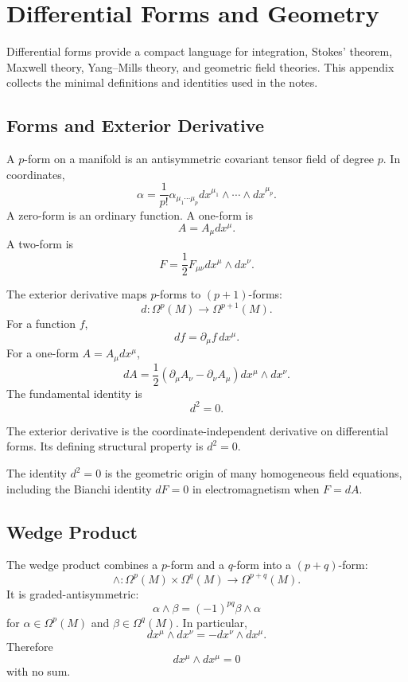 \chapter{Differential Forms and Geometry}

\begin{remarkbox}
Differential forms provide a compact language for integration, Stokes' theorem,
Maxwell theory, Yang--Mills theory, and geometric field theories. This appendix
collects the minimal definitions and identities used in the notes.
\end{remarkbox}

\section{Forms and Exterior Derivative}

A \(p\)-form on a manifold is an antisymmetric covariant tensor field of degree
\(p\). In coordinates,
\[
    \alpha=\frac{1}{p!}\alpha_{\mu_1\cdots\mu_p}
    dx^{\mu_1}\wedge\cdots\wedge dx^{\mu_p}.
\]
A zero-form is an ordinary function. A one-form is
\[
    A=A_\mu dx^\mu.
\]
A two-form is
\[
    F=\frac{1}{2}F_{\mu\nu}dx^\mu\wedge dx^\nu.
\]

The exterior derivative maps \(p\)-forms to \((p+1)\)-forms:
\[
    d:\Omega^p(M)\to\Omega^{p+1}(M).
\]
For a function \(f\),
\[
    df=\partial_\mu f\,dx^\mu.
\]
For a one-form \(A=A_\mu dx^\mu\),
\[
    dA=\frac{1}{2}(\partial_\mu A_\nu-\partial_\nu A_\mu)
    dx^\mu\wedge dx^\nu.
\]
The fundamental identity is
\[
    d^2=0.
\]

\begin{definitionbox}
The exterior derivative is the coordinate-independent derivative on differential
forms. Its defining structural property is \(d^2=0\).
\end{definitionbox}

The identity \(d^2=0\) is the geometric origin of many homogeneous field
equations, including the Bianchi identity \(dF=0\) in electromagnetism when
\(F=dA\).

\section{Wedge Product}

The wedge product combines a \(p\)-form and a \(q\)-form into a \((p+q)\)-form:
\[
    \wedge:\Omega^p(M)\times\Omega^q(M)\to\Omega^{p+q}(M).
\]
It is graded-antisymmetric:
\[
    \alpha\wedge\beta=(-1)^{pq}\beta\wedge\alpha
\]
for \(\alpha\in\Omega^p(M)\) and \(\beta\in\Omega^q(M)\). In particular,
\[
    dx^\mu\wedge dx^\nu=-dx^\nu\wedge dx^\mu.
\]
Therefore
\[
    dx^\mu\wedge dx^\mu=0
\]
with no sum.


